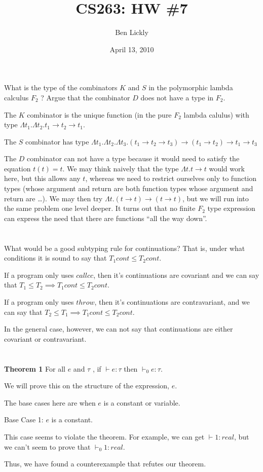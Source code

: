 \documentclass{article}
\title{CS263: HW \#7}
\author{Ben Lickly}
\date{April 13, 2010}
\newcommand{\problem}[1]
{\subsubsection*{} %
\vspace{-16pt} \section{} \vspace{-22pt} \qquad
#1%
\bigskip \bigskip
}
\newcommand{\proves}{\vdash}
\begin{document}
\maketitle

\problem{What is the type of the combinators $K$ and $S$ in the polymorphic
lambda calculus $F_2$ ? Argue that the combinator $D$ does not have a type in
$F_2$.
}

The $K$ combinator is the unique function (in the pure $F_2$
lambda calulus) with type
$\Lambda t_1. \Lambda t_2. t_1 \to t_2 \to t_1$.

The $S$ combinator has type
$\Lambda t_1. \Lambda t_2. \Lambda t_3.
(t_1 \to t_2 \to t_3) \to (t_1 \to t_2) \to t_1 \to t_3$

The $D$ combinator can not have a type because it would need to satisfy the
equation $t(t) = t$.  We may think naively that the type $\Lambda t. t \to t$
would work here, but this allows any $t$, whereas we need to restrict ourselves
only to function types (whose argument and return are both function types whose
argument and return are \dots).  We may then try
$\Lambda t. (t \to t) \to (t \to t)$, but we will run into the same problem one
level deeper.  It turns out that no finite $F_2$ type expression can express
the need that there are functions ``all the way down''.

\problem{What would be a good subtyping rule for continuations?  That is, under
what conditions it is sound to say that $T_1 cont \le T_2 cont$.
}

If a program only uses $callcc$, then it's continuations are covariant and we
can say that $T_1 \le T_2 \implies T_1 cont \le T_2 cont$.

If a program only uses $throw$, then it's continuations are contravariant, and
we can say that $T_2 \le T_1 \implies T_1 cont \le T_2 cont$.

In the general case, however, we can not say that continuations are either
covariant or contravariant.

\problem{
{\bf Theorem 1} For all $e$ and $\tau$ , if $\proves e:\tau$ then
$\proves_0 e:\tau$.
}

We will prove this on the structure of the expression, $e$.

The base cases here are when $e$ is a constant or variable.

Base Case 1:  $e$ is a constant.

This case seems to violate the theorem.  For example, we can get
$\proves 1 : real$, but we can't seem to prove that $\proves_0 1 : real$.

Thus, we have found a counterexample that refutes our theorem.
\end{document}
